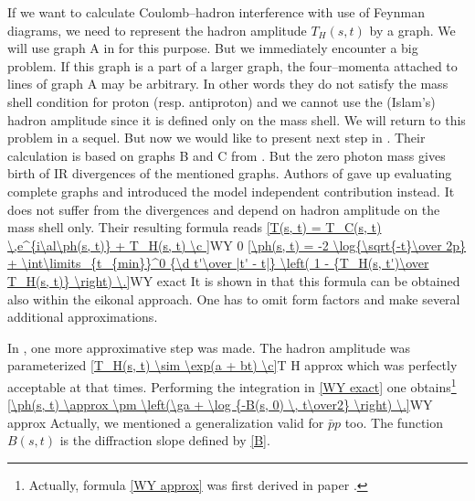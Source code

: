 If we want to calculate Coulomb--hadron interference with use of Feynman diagrams, we need to represent the hadron amplitude $T_H(s, t)$ by a graph. We will use graph A in \fg{}  for this purpose. But we immediately encounter a big problem. If this graph is a part of a larger graph, the four--momenta attached to lines of graph A may be arbitrary. In other words they do not satisfy the mass shell condition for proton (resp. antiproton) and we cannot use the (Islam's) hadron amplitude since it is defined only on the mass shell. We will return to this problem in a sequel. But now we would like to present next step in . Their calculation is based on graphs B and C from \fg{} . But the zero photon mass gives birth of IR divergences of the mentioned graphs. Authors of  gave up evaluating complete graphs and introduced the model independent contribution instead. It does not suffer from the divergences and depend on hadron amplitude on the mass shell only. Their resulting formula reads
\eqref{T(s, t) = T_C(s, t) \,e^{i\al\ph(s, t)} + T_H(s, t) \c }{WY 0}
\eqref{\ph(s, t) = -2 \log{\sqrt{-t}\over 2p} + \int\limits_{t_{min}}^0 {\d t'\over |t' - t|} \left( 1 - {T_H(s, t')\over T_H(s, t)} \right) \.}{WY exact}
It is shown in  that this formula can be obtained also within the eikonal approach. One has to omit form factors and make several additional approximations.

In , one more approximative step was made. The hadron amplitude was parameterized
\eqref{T_H(s, t) \sim \exp(a + bt) \c}{T H approx}
which was perfectly acceptable at that times. Performing the integration in \equ{} \ref{WY exact} one obtains\footnote{Actually, formula \ref{WY approx} was first derived in paper .}
\eqref{\ph(s, t) \approx \pm \left(\ga + \log {-B(s, 0) \, t\over2} \right) \.}{WY approx}
Actually, we mentioned a generalization  valid for $\bar pp$ too. The function $B(s, t)$ is the diffraction slope defined by \equ{} \ref{B}.

